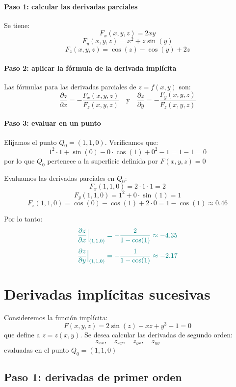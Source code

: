 \documentclass{article}
\begin{document}
\paragraph{\color{teal}Paso 1: calcular las derivadas parciales}  
Se tiene:
\[
F_x(x,y,z) = 2xy
\]
\[
F_y(x,y,z) = x^2 + z\sin(y)
\]
\[
F_z(x,y,z) = \cos(z) - \cos(y) + 2z
\]

\paragraph{\color{teal}Paso 2: aplicar la fórmula de la derivada implícita}  
Las fórmulas para las derivadas parciales de \( z = f(x,y) \) son:
\[
\frac{\partial z}{\partial x} = -\frac{F_x(x,y,z)}{F_z(x,y,z)} \quad \text{y} \quad \frac{\partial z}{\partial y} = -\frac{F_y(x,y,z)}{F_z(x,y,z)}
\]

\paragraph{\color{teal}Paso 3: evaluar en un punto}  
Elijamos el punto \( Q_0 = (1,1,0) \). Verificamos que:
\[
1^2 \cdot 1 + \sin(0) - 0 \cdot \cos(1) + 0^2 - 1 = 1 - 1 = 0
\]
por lo que \( Q_0 \) pertenece a la superficie definida por \( F(x,y,z) = 0 \)

Evaluamos las derivadas parciales en \( Q_0 \):
\[
F_x(1,1,0) = 2 \cdot 1 \cdot 1 = 2
\]
\[
F_y(1,1,0) = 1^2 + 0 \cdot \sin(1) = 1
\]
\[
F_z(1,1,0) = \cos(0) - \cos(1) + 2 \cdot 0 = 1 - \cos(1) \approx 0.46
\]

Por lo tanto:
\[
\color{teal}
\frac{\partial z}{\partial x}\Big|_{(1,1,0)} = -\frac{2}{1 - \cos(1)} \approx -4.35
\]
\[
\color{teal}
\frac{\partial z}{\partial y}\Big|_{(1,1,0)} = -\frac{1}{1 - \cos(1)} \approx -2.17
\]

\section*{Derivadas implícitas sucesivas}

Consideremos la función implícita:
\[
F(x,y,z) = 2\sin(z) - xz + y^3 - 1 = 0
\]
que define a \( z = z(x,y) \). Se desea calcular las derivadas de segundo orden:
\[
z_{xx},\quad z_{xy},\quad z_{yx},\quad z_{yy}
\]
evaluadas en el punto \( Q_0 = (1,1,0) \)

\subsection*{Paso 1: derivadas de primer orden}
\end{document}
